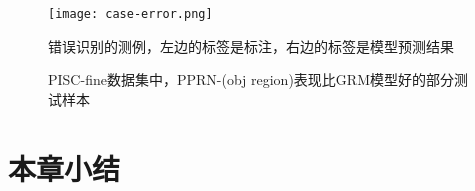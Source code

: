 \begin{figure}[htpb]
	\centering
	\texttt{[image: case-error.png]}
    \caption{错误识别的测例，左边的标签是标注，右边的标签是模型预测结果}
	\vspace*{-3.5mm}
	\label{fig:exp-error-case}
\end{figure}

\begin{figure}[htpb]
	\centering
    \caption{PISC-fine数据集中，PPRN-(obj region)表现比GRM模型好的部分测试样本}
    \label{fig:exp-case-study}
\end{figure}

\section{本章小结}

